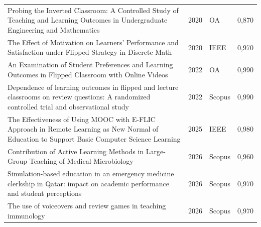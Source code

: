 \begin{longtable}{@{}>{\raggedright\arraybackslash}p{}%
    r>{\raggedright\arraybackslash}p{}r@{}}
  Probing the Inverted Classroom: A Controlled Study of Teaching and Learning Outcomes in Undergraduate Engineering and Mathematics & 2020 & OA & 0,870 \\
  The Effect of Motivation on Learners' Performance and Satisfaction under Flipped Strategy in Discrete Math & 2020 & IEEE & 0,970 \\
  An Examination of Student Preferences and Learning Outcomes in Flipped Classroom with Online Videos & 2022 & OA & 0,990 \\
  Dependence of learning outcomes in flipped and lecture classrooms on review questions: A randomized controlled trial and observational study & 2022 & Scopus & 0,990 \\
  The Effectiveness of Using MOOC with E-FLIC Approach in Remote Learning as New Normal of Education to Support Basic Computer Science Learning & 2025 & IEEE & 0,980 \\
  Contribution of Active Learning Methods in Large-Group Teaching of Medical Microbiology & 2026 & Scopus & 0,960 \\
  Simulation-based education in an emergency medicine clerkship in Qatar: impact on academic performance and student perceptions & 2026 & Scopus & 0,970 \\
  The use of voiceovers and review games in teaching immunology & 2026 & Scopus & 0,970 \\
\end{longtable}
\endgroup
